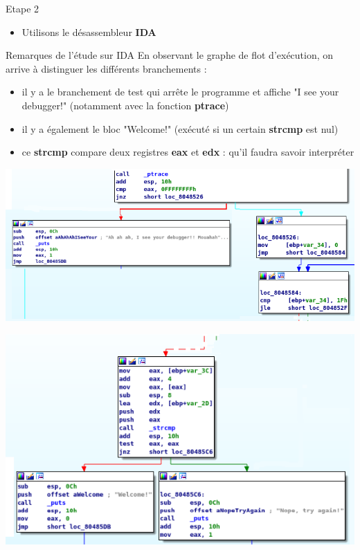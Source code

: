 \documentclass{beamer}
\begin{document}
\begin{frame}
\begin{block}{Etape 2}
\begin{itemize}
\item Utilisons le désassembleur \textbf{IDA}
\end{itemize}
\end{block}
\begin{exampleblock}{Remarques de l'étude sur IDA} 
En observant le graphe de flot d'exécution, on arrive à distinguer les différents branchements : 
\begin{itemize}
\item il y a le branchement de test qui arrête le programme et affiche "I see your debugger!" (notamment avec la fonction \textbf{ptrace})
\item il y a également le bloc "Welcome!" (exécuté si un certain \textbf{strcmp} est nul)
\item ce \textbf{strcmp} compare deux registres \textbf{eax} et \textbf{edx} : qu'il faudra savoir interpréter
\end{itemize}
\end{exampleblock}
\end{frame}

\begin{frame}
\begin{center}
\includegraphics[scale=0.5]{./pictures/113-reversing-2-ida-3.PNG}
\end{center}
\end{frame}

\begin{frame}
\begin{center}
\includegraphics[scale=0.5]{./pictures/113-reversing-2-ida-4.PNG}
\end{center}
\end{frame}
\end{document}
